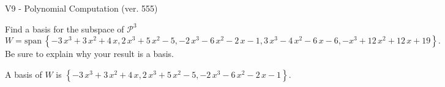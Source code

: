 \begin{exercise}
  \begin{exerciseTitle}V9 - Polynomial Computation (ver. 555)\end{exerciseTitle}
  \begin{exerciseStatement}
    Find a basis for the subspace of \(\mathcal{P}^3\) 
\[W=\mathrm{span}\ \left\{-3 \, x^{3} + 3 \, x^{2} + 4 \, x , 2 \, x^{3} + 5 \, x^{2} - 5 , -2 \, x^{3} - 6 \, x^{2} - 2 \, x - 1 , 3 \, x^{3} - 4 \, x^{2} - 6 \, x - 6 , -x^{3} + 12 \, x^{2} + 12 \, x + 19\right\}.\]
 Be sure to explain why your result is a basis.


  \end{exerciseStatement}
  \begin{exerciseAnswer}
   A basis of \(W\) is  \(\left\{-3 \, x^{3} + 3 \, x^{2} + 4 \, x , 2 \, x^{3} + 5 \, x^{2} - 5 , -2 \, x^{3} - 6 \, x^{2} - 2 \, x - 1\right\}\).
  


  \end{exerciseAnswer}
\end{exercise}